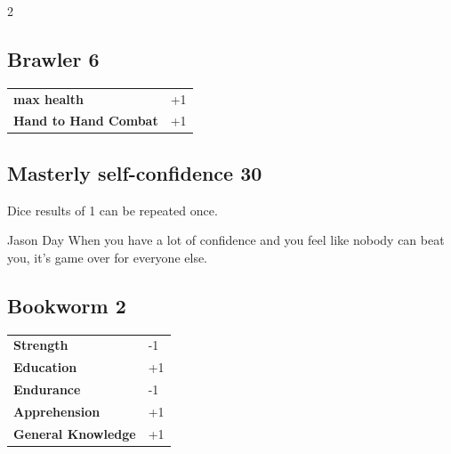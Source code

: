 \begin{multicols}{2}
\begin{tcolorbox}
    \subsection*{Brawler \hfill \small{6 }}
    \tcblower




\begin{tabular}{@{}ll@{}}
    \textbf{max health} & +1\\
    \textbf{Hand to Hand Combat} & +1\\
\end{tabular}


\end{tcolorbox}

\begin{tcolorbox}
    \subsection*{Masterly self-confidence \hfill \small{30 }}
    \tcblower
Dice results of 1 can be repeated once.

\begin{pquote}{Jason Day}
When you have a lot of confidence and you feel like nobody can beat you, it’s game over for everyone else.
\end{pquote}

\vspace{3mm}



\end{tcolorbox}

\begin{tcolorbox}
    \subsection*{Bookworm \hfill \small{2 }}
    \tcblower




\begin{tabular}{@{}ll@{}}
    \textbf{Strength} & -1\\
    \textbf{Education} & +1\\
    \textbf{Endurance} & -1\\
    \textbf{Apprehension} & +1\\
    \textbf{General Knowledge} & +1\\
\end{tabular}


\end{tcolorbox}
\end{multicols}
